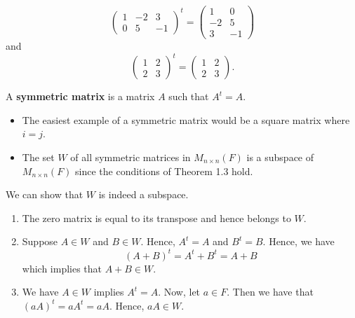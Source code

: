 \begin{eg}
    \[ \begin{pmatrix}
        1 & -2 & 3 \\
        0 & 5 & -1
    \end{pmatrix}^{t} =  \begin{pmatrix}
        1 & 0 \\ 
        -2 & 5 \\
        3 & -1
    \end{pmatrix}  \]
    and 
    \[  \begin{pmatrix}
        1 & 2 \\ 
        2 & 3 
        \end{pmatrix}^{t} = \begin{pmatrix}
            1 & 2 \\
            2 & 3
        \end{pmatrix}.\]
\end{eg}

\begin{definition}
    A \textbf{symmetric matrix} is a matrix \( A  \) such that \( A^{t} = A  \).
\end{definition}

\begin{itemize}
    \item The easiest example of a symmetric matrix would be a square matrix where \( i = j  \). 
    \item The set \( W  \) of all symmetric matrices in \( M_{n \times n}(F ) \) is a subspace of \( M_{n \times n}(F)  \) since the conditions of Theorem 1.3 hold.
\end{itemize}

We can show that \( W  \) is indeed a subspace.

\begin{enumerate}
    \item The zero matrix is equal to its transpose and hence belongs to \( W  \).
    \item Suppose \( A \in W  \) and \( B \in W  \). Hence, \( A^{t} = A  \) and \( B^{t} = B  \). Hence, we have 
        \[  (A+B)^{t} = A^{t} + B^{t} = A + B \]
        which implies that \( A + B \in W  \).
    \item We have \( A \in W  \) implies \( A^{t} = A  \). Now, let \( a \in F  \). Then we have that \( (aA)^{t} = a A^{t} = aA  \). Hence, \( aA \in W  \).
\end{enumerate}

